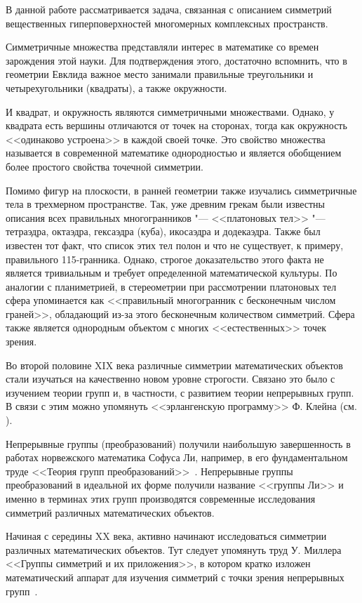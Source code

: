 \documentclass[../main.tex]{subfiles}
\begin{document}
В данной работе рассматривается задача, связанная с описанием симметрий вещественных гиперповерхностей многомерных комплексных пространств.

Симметричные множества представляли интерес в математике со времен зарождения этой науки. Для подтверждения этого, достаточно вспомнить, что в геометрии Евклида важное место занимали правильные треугольники и четырехугольники (квадраты), а также окружности.

И квадрат, и окружность являются симметричными множествами. Однако, у квадрата есть вершины отличаются от точек на сторонах, тогда как окружность <<одинаково устроена>> в каждой своей точке. Это свойство множества называется в современной математике однородностью и является обобщением более простого свойства точечной симметрии.

Помимо фигур на плоскости, в ранней геометрии также изучались симметричные тела в трехмерном пространстве. Так, уже древним грекам были известны описания всех правильных многогранников "--- <<платоновых тел>> "--- тетраэдра, октаэдра, гексаэдра (куба), икосаэдра и додекаэдра. Также был известен тот факт, что список этих тел полон и что не существует, к примеру, правильного 115-гранника. Однако, строгое доказательство этого факта не является тривиальным и требует определенной математической культуры. По аналогии с планиметрией, в стереометрии при рассмотрении платоновых тел сфера упоминается как <<правильный многогранник с бесконечным числом граней>>, обладающий из-за этого бесконечным количеством симметрий. Сфера также является однородным объектом с многих <<естественных>> точек зрения.

Во второй половине XIX века различные симметрии математических объектов стали изучаться на качественно новом уровне строгости. Связано это было с изучением теории групп и, в частности, с развитием теории непрерывных групп. В связи с этим можно упомянуть <<эрлангенскую программу>> Ф. Клейна (см. \cite{klein}).

Непрерывные группы (преобразований) получили наибольшую завершенность в работах норвежского математика Софуса Ли, например, в его фундаментальном труде <<Теория групп преобразований>>~\cite{lie}. Непрерывные группы преобразований в идеальной их форме получили название <<группы Ли>> и именно в терминах этих групп производятся современные исследования симметрий различных математических объектов.

Начиная с середины XX века, активно начинают исследоваться симметрии различных математических объектов. Тут следует упомянуть труд У. Миллера <<Группы симметрий и их приложения>>, в котором кратко изложен математический аппарат для изучения симметрий с точки зрения непрерывных групп~\cite{miller1973symmetry}.
\end{document}
